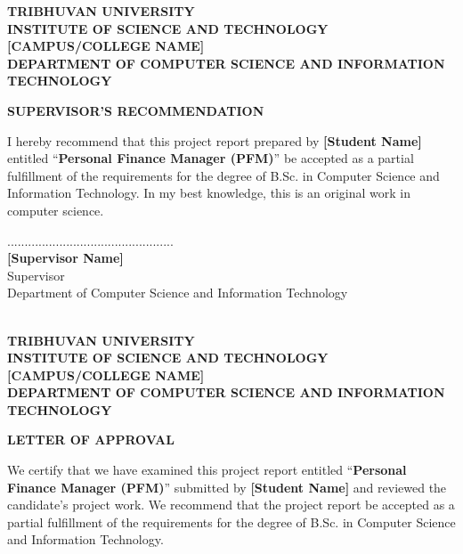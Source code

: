 \documentclass[12pt, a4paper]{report}
\begin{document}
\newpage
\begin{center}
    \textbf{\large TRIBHUVAN UNIVERSITY} \\
    \textbf{\large INSTITUTE OF SCIENCE AND TECHNOLOGY} \\
    \textbf{\large [CAMPUS/COLLEGE NAME]} \\
    \textbf{\large DEPARTMENT OF COMPUTER SCIENCE AND INFORMATION TECHNOLOGY}
    
    \vspace{1cm}
    
    \textbf{\large SUPERVISOR'S RECOMMENDATION}
\end{center}
\vspace{0.5cm}
I hereby recommend that this project report prepared by \textbf{[Student Name]} entitled ``\textbf{Personal Finance Manager (PFM)}'' be accepted as a partial fulfillment of the requirements for the degree of B.Sc. in Computer Science and Information Technology. In my best knowledge, this is an original work in computer science.

\vspace{2cm}

\noindent ................................................ \\
\textbf{[Supervisor Name]} \\
Supervisor \\
Department of Computer Science and Information Technology \\
[Campus Name] \\
[Date]

\newpage
\begin{center}
    \textbf{\large TRIBHUVAN UNIVERSITY} \\
    \textbf{\large INSTITUTE OF SCIENCE AND TECHNOLOGY} \\
    \textbf{\large [CAMPUS/COLLEGE NAME]} \\
    \textbf{\large DEPARTMENT OF COMPUTER SCIENCE AND INFORMATION TECHNOLOGY}
    
    \vspace{1cm}
    
    \textbf{\large LETTER OF APPROVAL}
\end{center}
\vspace{0.5cm}
We certify that we have examined this project report entitled ``\textbf{Personal Finance Manager (PFM)}'' submitted by \textbf{[Student Name]} and reviewed the candidate's project work. We recommend that the project report be accepted as a partial fulfillment of the requirements for the degree of B.Sc. in Computer Science and Information Technology.
\end{document}
